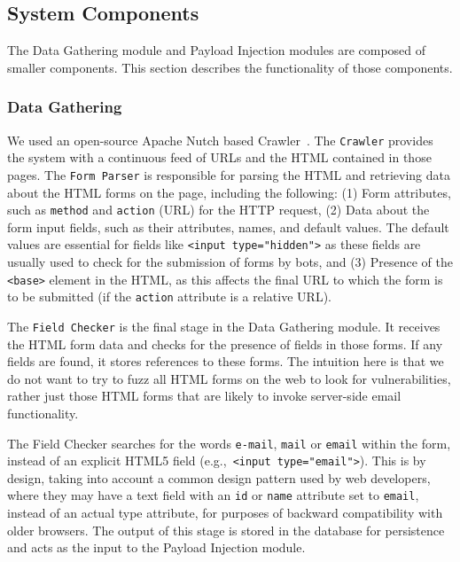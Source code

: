 \subsection{System Components}
\label{Comp}

The Data Gathering module and Payload Injection modules are composed of smaller components. This section describes the functionality of those components.

\subsubsection{Data Gathering}
\label{Comp:Crawler}
We used an open-source Apache Nutch based Crawler~\cite{nutch}. The \texttt{Crawler} provides the system with a continuous feed of URLs and the HTML contained in those pages. 
\label{Comp:FP}
The \texttt{Form Parser} is responsible for parsing the HTML and retrieving data about the HTML
forms on the page, including the following: (1) Form attributes, such
as \texttt{method} and \texttt{action} (URL) for the HTTP request, (2)
Data about the form input fields, such as their attributes, names, and
default values. The default values are essential for fields like
{\lstinline{<input type="hidden">}} as these fields are usually used
to check for the submission of forms by bots, and (3) Presence of the {\lstinline{<base>}} element in the HTML, as this affects the final URL to which the form is to be submitted (if the \texttt{action} attribute is a relative URL).

\label{Comp:EMFC}
The \texttt{\Email Field Checker} is the final stage in the Data Gathering module. It receives the HTML form data and checks for the presence of \email fields in those forms. If any \email fields are found, it stores references to these forms.
The intuition here is that we do not want to try to fuzz all HTML forms on the web to look for \ehi vulnerabilities, rather just those HTML forms that are likely to invoke server-side email functionality.

The \Email Field Checker searches for the words \texttt{e-mail},
\texttt{mail} or \texttt{email} within the form, instead of an
explicit HTML5 \email field (e.g.,\ {\lstinline{<input type="email">}}). This is by design, taking into account a common
design pattern used by web developers, where they may have a text
field with an \texttt{id} or \texttt{name} attribute set to
\texttt{email}, instead of an actual \email type attribute, for
purposes of backward compatibility with older browsers. The output of this stage is stored in the database for persistence and acts as the input to the Payload Injection module.

